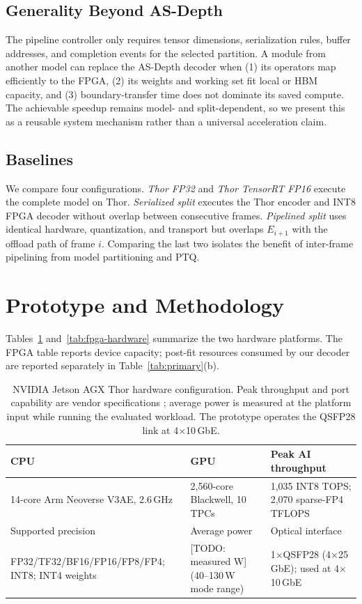 \documentclass[sigconf]{support/acmart}
\newcommand{\todo}[1]{\textcolor{ACMRed}{[TODO: #1]}}
\begin{document}
\subsection{Generality Beyond AS-Depth}

The pipeline controller only requires tensor dimensions, serialization rules,
buffer addresses, and completion events for the selected partition.  A module
from another model can replace the AS-Depth decoder when (1) its operators map
efficiently to the FPGA, (2) its weights and working set fit local or HBM
capacity, and (3) boundary-transfer time does not dominate its saved compute.
The achievable speedup remains model- and split-dependent, so we present this as
a reusable system mechanism rather than a universal acceleration claim.

\subsection{Baselines}

We compare four configurations.  \emph{Thor FP32} and \emph{Thor TensorRT
FP16} execute the complete model on Thor.  \emph{Serialized split} executes the
Thor encoder and INT8 FPGA decoder without overlap between consecutive frames.
\emph{Pipelined split} uses identical hardware, quantization, and transport but
overlaps $E_{i+1}$ with the offload path of frame $i$.  Comparing the last two
isolates the benefit of inter-frame pipelining from model partitioning and PTQ.

\section{Prototype and Methodology}

Tables~\ref{tab:thor-hardware} and~\ref{tab:fpga-hardware} summarize the two
hardware platforms.  The FPGA table reports device capacity; post-fit resources
consumed by our decoder are reported separately in Table~\ref{tab:primary}(b).

\begin{table}[t]
  \caption{NVIDIA Jetson AGX Thor hardware configuration.  Peak throughput and
  port capability are vendor specifications \cite{nvidiathorintro,nvidiathorspec};
  average power is measured at the platform input while running the evaluated
  workload.  The prototype operates the QSFP28 link at 4$\times$10\,GbE.}
  \label{tab:thor-hardware}
  \centering
  \small
  \begin{tabular}{p{}p{}p{}}
    \toprule
    CPU & GPU & Peak AI throughput \\
    \midrule
    14-core Arm Neoverse V3AE, 2.6\,GHz &
    2,560-core Blackwell, 10 TPCs &
    1,035 INT8 TOPS; 2,070 sparse-FP4 TFLOPS \\
    \midrule
    Supported precision & Average power & Optical interface \\
    \midrule
    FP32/TF32/BF16/FP16/FP8/FP4; INT8; INT4 weights &
    \todo{measured W} (40--130\,W mode range) &
    1$\times$QSFP28 (4$\times$25\,GbE); used at 4$\times$10\,GbE \\
    \bottomrule
  \end{tabular}
\end{table}
\end{document}
